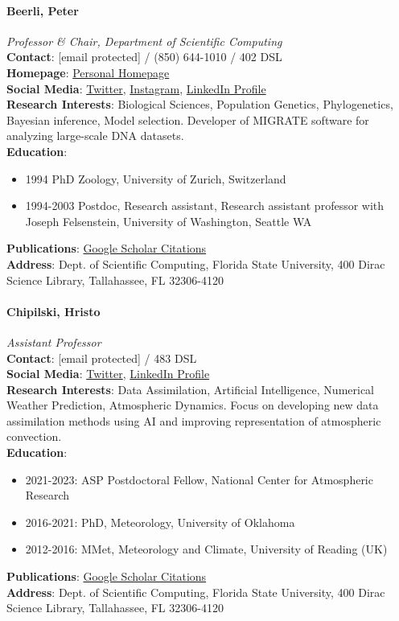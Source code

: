 \documentclass[12pt,a4paper]{article}
\begin{document}
\paragraph{Beerli, Peter}
\textit{Professor \& Chair, Department of Scientific Computing}\\
\textbf{Contact}: [email protected] / (850) 644-1010 / 402 DSL\\
\textbf{Homepage}: \href{http://people.sc.fsu.edu/~pbeerli/}{Personal Homepage}\\
\textbf{Social Media}: \href{https://twitter.com/peterbeerli}{Twitter}, \href{https://www.instagram.com/peterbeerli/}{Instagram}, \href{https://www.linkedin.com/in/peter-beerli-4b55345/}{LinkedIn Profile}\\
\textbf{Research Interests}: Biological Sciences, Population Genetics, Phylogenetics, Bayesian inference, Model selection. Developer of MIGRATE software for analyzing large-scale DNA datasets.\\
\textbf{Education}:
\begin{itemize}
    \item 1994 PhD Zoology, University of Zurich, Switzerland
    \item 1994-2003 Postdoc, Research assistant, Research assistant professor with Joseph Felsenstein, University of Washington, Seattle WA
\end{itemize}
\textbf{Publications}: \href{https://scholar.google.com/citations?user=4ws5d1kAAAAJ}{Google Scholar Citations}\\
\textbf{Address}: Dept. of Scientific Computing, Florida State University, 400 Dirac Science Library, Tallahassee, FL 32306-4120

\paragraph{Chipilski, Hristo}
\textit{Assistant Professor}\\
\textbf{Contact}: [email protected] / 483 DSL\\
\textbf{Social Media}: \href{https://twitter.com/hristochipilski}{Twitter}, \href{https://www.linkedin.com/in/hristo-chipilski-b12480119/}{LinkedIn Profile}\\
\textbf{Research Interests}: Data Assimilation, Artificial Intelligence, Numerical Weather Prediction, Atmospheric Dynamics. Focus on developing new data assimilation methods using AI and improving representation of atmospheric convection.\\
\textbf{Education}:
\begin{itemize}
    \item 2021-2023: ASP Postdoctoral Fellow, National Center for Atmospheric Research
    \item 2016-2021: PhD, Meteorology, University of Oklahoma
    \item 2012-2016: MMet, Meteorology and Climate, University of Reading (UK)
\end{itemize}
\textbf{Publications}: \href{https://scholar.google.com/citations?user=wU9kYnUAAAAJ}{Google Scholar Citations}\\
\textbf{Address}: Dept. of Scientific Computing, Florida State University, 400 Dirac Science Library, Tallahassee, FL 32306-4120
\end{document}
